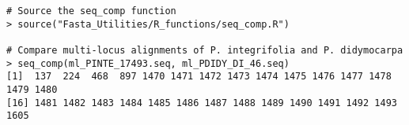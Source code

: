 \vspace*{30pt}

\begin{lstlisting}[caption=Example of the \textbf{seq\_comp} function,
    basicstyle=\small]
# Source the seq_comp function
> source("Fasta_Utilities/R_functions/seq_comp.R")

# Compare multi-locus alignments of P. integrifolia and P. didymocarpa
> seq_comp(ml_PINTE_17493.seq, ml_PDIDY_DI_46.seq)
[1]  137  224  468  897 1470 1471 1472 1473 1474 1475 1476 1477 1478 1479 1480
[16] 1481 1482 1483 1484 1485 1486 1487 1488 1489 1490 1491 1492 1493 1605
\end{lstlisting}

